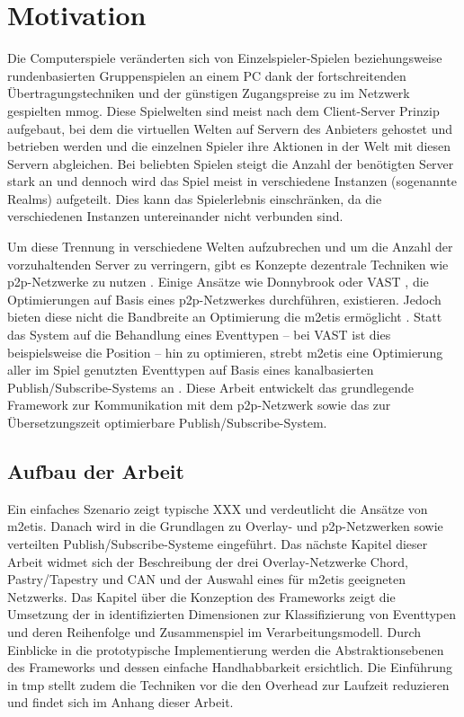 \chapter{Motivation}
\label{chap:einleitung}
Die Computerspiele veränderten sich von Einzelspieler-Spielen beziehungsweise rundenbasierten Gruppenspielen an einem PC dank der fortschreitenden Übertragungs\-techniken und der günstigen Zugangspreise zu im Netzwerk gespielten \ac{mmog}. Diese Spielwelten sind meist nach dem Client-Server Prinzip aufgebaut, bei dem die virtuellen Welten auf Servern des Anbieters gehostet und betrieben werden und die einzelnen Spieler ihre Aktionen in der Welt mit diesen Servern abgleichen. Bei beliebten Spielen steigt die Anzahl der benötigten Server stark an und dennoch wird das Spiel meist in verschiedene Instanzen (sogenannte Realms) aufgeteilt. Dies kann das Spielerlebnis einschränken, da die verschiedenen Instanzen untereinander nicht verbunden sind.

Um diese Trennung in verschiedene Welten aufzubrechen und um die Anzahl der vorzuhaltenden Server zu verringern, gibt es Konzepte dezentrale Techniken wie \ac{p2p}-Netzwerke zu nutzen \cite{Knutsson2004Peertopeer, Triebel2008Peertopeer}. Einige Ansätze wie Donnybrook \cite{Bharambe2008Donnybrook} oder VAST \cite{Backhaus2007Voronoibased}, die Optimierungen auf Basis eines \ac{p2p}-Netzwerkes durchführen, existieren. Jedoch bieten diese nicht die Bandbreite an Optimierung die \ac{m2etis} ermöglicht \cite{Fischer2010Event}. Statt das System auf die Behandlung eines Eventtypen -- bei VAST ist dies beispielsweise die Position -- hin zu optimieren, strebt \ac{m2etis} eine Optimierung aller im Spiel genutzten Eventtypen auf Basis eines kanalbasierten Publish/Subscribe-Systems an \cite{Fischer2010a}. Diese Arbeit entwickelt das grundlegende Framework zur Kommunikation mit dem \ac{p2p}-Netzwerk sowie das zur Übersetzungszeit optimierbare Publish/Subscribe-System.

\section*{Aufbau der Arbeit}
Ein einfaches Szenario zeigt typische XXX und verdeutlicht die Ansätze von \ac{m2etis}. Danach wird in die Grundlagen zu Overlay- und p2p-Netzwerken sowie verteilten Publish/Subscribe-Systeme eingeführt. Das nächste Kapitel dieser Arbeit widmet sich der Beschreibung der drei Overlay-Netzwerke Chord, Pastry/Tapestry und CAN und der Auswahl eines für \ac{m2etis} geeigneten Netzwerks. Das Kapitel über die Konzeption des Frameworks zeigt die Umsetzung der in \cite{Fischer2010Event} identifizierten Dimensionen zur Klassifizierung von Eventtypen und deren Reihenfolge und Zusammenspiel im Verarbeitungsmodell. Durch Einblicke in die prototypische Implementierung werden die Abstraktionsebenen des Frameworks und dessen einfache Handhabbarkeit ersichtlich. Die Einführung in \ac{tmp} stellt zudem die Techniken vor die den Overhead zur Laufzeit reduzieren und findet sich im Anhang dieser Arbeit.
